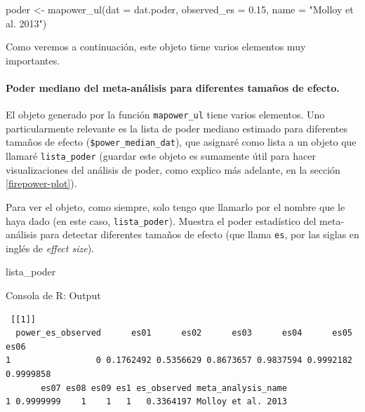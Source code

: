 \documentclass[
  bookmarksnumbered]{article}
\newenvironment{Shaded}{\begin{snugshade}}{\end{snugshade}}
\newcommand{\AttributeTok}[1]{\textcolor[rgb]{0.00,0.34,0.68}{#1}}
\newcommand{\FloatTok}[1]{\textcolor[rgb]{0.69,0.50,0.00}{#1}}
\newcommand{\FunctionTok}[1]{\textcolor[rgb]{0.39,0.29,0.61}{#1}}
\newcommand{\NormalTok}[1]{\textcolor[rgb]{0.12,0.11,0.11}{#1}}
\newcommand{\OtherTok}[1]{\textcolor[rgb]{0.00,0.43,0.16}{#1}}
\newcommand{\SpecialCharTok}[1]{\textcolor[rgb]{0.24,0.68,0.91}{#1}}
\newcommand{\StringTok}[1]{\textcolor[rgb]{0.75,0.01,0.01}{#1}}
\begin{document}
\begin{Shaded}
\begin{Highlighting}[]
\NormalTok{poder }\OtherTok{\textless{}{-}} \FunctionTok{mapower\_ul}\NormalTok{(}\AttributeTok{dat =}\NormalTok{ dat.poder, }\AttributeTok{observed\_es =} \FloatTok{0.15}\NormalTok{, }\AttributeTok{name =} \StringTok{"Molloy et al. 2013"}\NormalTok{)}
\end{Highlighting}
\end{Shaded}

Como veremos a continuación, este objeto tiene varios elementos muy importantes.

\hypertarget{poder-mediano}{%
\paragraph{Poder mediano del meta-análisis para diferentes tamaños de efecto.}\label{poder-mediano}}

El objeto generado por la función \texttt{mapower\_ul} tiene varios elementos. Uno particularmente relevante es la lista de poder mediano estimado para diferentes tamaños de efecto (\texttt{\$power\_median\_dat}), que asignaré como lista a un objeto que llamaré \texttt{lista\_poder} (guardar este objeto es sumamente útil para hacer visualizaciones del análisis de poder, como explico más adelante, en la sección \ref{firepower-plot}).

\begin{Shaded}
\end{Shaded}

Para ver el objeto, como siempre, solo tengo que llamarlo por el nombre que le haya dado (en este caso, \texttt{lista\_poder}). Muestra el poder estadístico del meta-análisis para detectar diferentes tamaños de efecto (que llama \texttt{es}, por las siglas en inglés de \emph{effect size}).

\begin{Shaded}
\begin{Highlighting}[]
\NormalTok{lista\_poder}
\end{Highlighting}
\end{Shaded}

\begin{ROut}{Consola de R: Output~\thetcbcounter}
                \begin{footnotesize}
                \begin{verbatim} [[1]]
  power_es_observed      es01      es02      es03      es04      es05      es06
1                 0 0.1762492 0.5356629 0.8673657 0.9837594 0.9992182 0.9999858
       es07 es08 es09 es1 es_observed meta_analysis_name
1 0.9999999    1    1   1   0.3364197 Molloy et al. 2013
 \end{verbatim}
                \end{footnotesize}
                \end{ROut}
\end{document}
